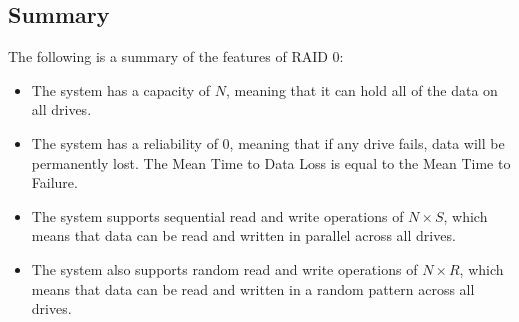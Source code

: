\subsection{Summary}
The following is a summary of the features of RAID 0:
\begin{itemize}
\item The system has a capacity of $N$, meaning that it can hold all of the data on all drives.
\item The system has a reliability of $0$, meaning that if any drive fails, data will be permanently lost. 
    The Mean Time to Data Loss is equal to the Mean Time to Failure.
\item The system supports sequential read and write operations of $N\times S$, which means that data can be read and written in parallel across all drives.
\item The system also supports random read and write operations of $N\times R$, which means that data can be read and written in a random pattern across all drives.
\end{itemize}